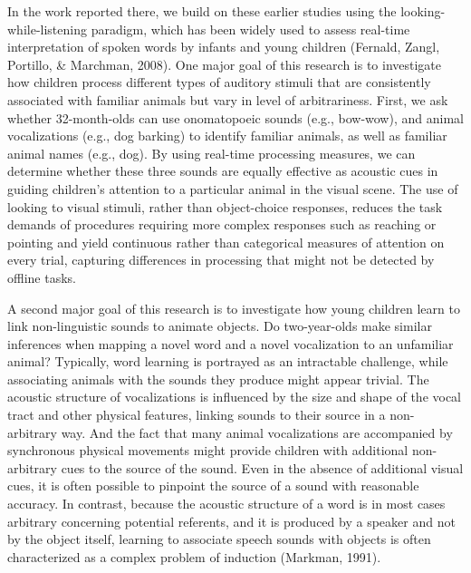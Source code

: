 \documentclass[english,floatsintext,man]{apa6}
\theoremstyle{definition}
\theoremstyle{definition}
\theoremstyle{definition}
\theoremstyle{remark}
\begin{document}
In the work reported there, we build on these earlier studies using the
looking-while-listening paradigm, which has been widely used to assess
real-time interpretation of spoken words by infants and young children
(Fernald, Zangl, Portillo, \& Marchman, 2008). One major goal of this
research is to investigate how children process different types of
auditory stimuli that are consistently associated with familiar animals
but vary in level of arbitrariness. First, we ask whether 32-month-olds
can use onomatopoeic sounds (e.g., bow-wow), and animal vocalizations
(e.g., dog barking) to identify familiar animals, as well as familiar
animal names (e.g., dog). By using real-time processing measures, we can
determine whether these three sounds are equally effective as acoustic
cues in guiding children's attention to a particular animal in the
visual scene. The use of looking to visual stimuli, rather than
object-choice responses, reduces the task demands of procedures
requiring more complex responses such as reaching or pointing and yield
continuous rather than categorical measures of attention on every trial,
capturing differences in processing that might not be detected by
offline tasks.

A second major goal of this research is to investigate how young
children learn to link non-linguistic sounds to animate objects. Do
two-year-olds make similar inferences when mapping a novel word and a
novel vocalization to an unfamiliar animal? Typically, word learning is
portrayed as an intractable challenge, while associating animals with
the sounds they produce might appear trivial. The acoustic structure of
vocalizations is influenced by the size and shape of the vocal tract and
other physical features, linking sounds to their source in a
non-arbitrary way. And the fact that many animal vocalizations are
accompanied by synchronous physical movements might provide children
with additional non-arbitrary cues to the source of the sound. Even in
the absence of additional visual cues, it is often possible to pinpoint
the source of a sound with reasonable accuracy. In contrast, because the
acoustic structure of a word is in most cases arbitrary concerning
potential referents, and it is produced by a speaker and not by the
object itself, learning to associate speech sounds with objects is often
characterized as a complex problem of induction (Markman, 1991).
\end{document}
